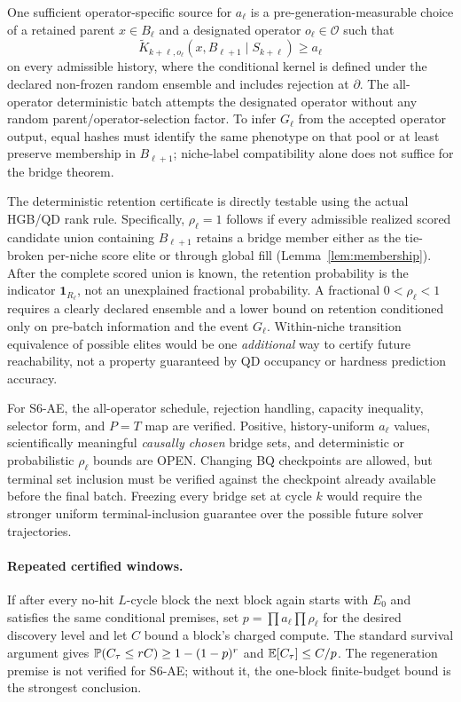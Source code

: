 \begin{proposition}
One sufficient operator-specific source for $a_\ell$ is a
pre-generation-measurable choice of a retained parent $x\in B_\ell$ and a
designated operator $o_\ell\in\mathcal O$ such that
\[
 \widetilde K_{k+\ell,o_\ell}
 (x,B_{\ell+1}\mid S_{k+\ell})\geq a_\ell
\]
on every admissible history, where the conditional kernel is defined under
the declared non-frozen random ensemble and includes rejection at
$\partial$. The all-operator deterministic batch attempts the designated
operator without any random parent/operator-selection factor.
To infer $G_\ell$ from the accepted operator output, equal hashes must
identify the same phenotype on that pool or at least preserve membership
in $B_{\ell+1}$; niche-label compatibility alone does not suffice for
the bridge theorem.
\end{proposition}

The deterministic retention certificate is directly testable using the
actual HGB/QD rank rule. Specifically, $\rho_\ell=1$ follows if every
admissible realized scored candidate union containing $B_{\ell+1}$ retains
a bridge member either as the tie-broken per-niche score elite or through
global fill (Lemma~\ref{lem:membership}). After the complete scored union is
known, the retention probability is the indicator
$\mathbf 1_{R_\ell}$, not an unexplained fractional probability.
A fractional $0<\rho_\ell<1$ requires a clearly declared ensemble and
a lower bound on retention conditioned only on pre-batch information and
the event $G_\ell$. Within-niche transition equivalence of possible elites
would be one \emph{additional} way to certify future reachability, not a
property guaranteed by QD occupancy or hardness prediction accuracy.

For S6-AE, the all-operator schedule, rejection handling, capacity inequality,
selector form, and $P=T$ map are verified. Positive, history-uniform
$a_\ell$ values, scientifically meaningful \emph{causally chosen} bridge
sets, and deterministic or probabilistic $\rho_\ell$ bounds are OPEN.
Changing BQ checkpoints are allowed, but terminal set inclusion must be
verified against the checkpoint already available before the final batch.
Freezing every bridge set at cycle $k$ would require the stronger uniform
terminal-inclusion guarantee over the possible future solver trajectories.

\paragraph{Repeated certified windows.}
 
If after every no-hit $L$-cycle block the next block again starts with $E_0$
and satisfies the same conditional premises, set
$p=\prod a_\ell\prod\rho_\ell$ for the desired discovery level and let
$C$ bound a block's charged compute. The standard survival argument gives
$\mathbb{P}(C_\tau\leq rC)\geq1-(1-p)^r$ and
$\mathbb{E}[C_\tau]\leq C/p$. The regeneration premise is not verified for S6-AE;
without it, the one-block finite-budget bound is the strongest conclusion.

